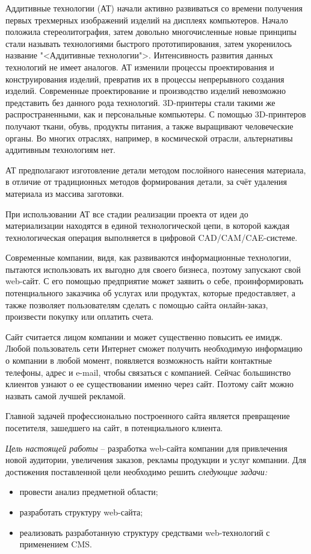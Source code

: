 \newsection
{}

Аддитивные технологии (АТ) начали активно развиваться со времени получения первых трехмерных изображений изделий на дисплеях компьютеров. Начало положила стереолитография, затем довольно многочисленные новые принципы стали называть технологиями быстрого прототипирования, затем укоренилось название "<Аддитивные технологии">. Интенсивность развития данных технологий не имеет аналогов. АТ изменили процессы проектирования и конструирования изделий, превратив их в процессы непрерывного создания изделий. Современные проектирование и производство изделий невозможно представить без данного рода технологий. 3D-принтеры стали такими же распространенными, как и персональные компьютеры. С помощью 3D-принтеров получают ткани, обувь, продукты питания, а также выращивают человеческие органы. Во многих отраслях, например, в космической отрасли, альтернативы аддитивным технологиям нет.

АТ предполагают изготовление детали методом послойного нанесения материала, в отличие от традиционных методов формирования детали, за счёт удаления материала из массива заготовки.

При использовании АТ все стадии реализации проекта от идеи до материализации находятся в единой технологической цепи, в которой каждая технологическая операция выполняется в цифровой CAD/CAM/CAE-системе.

Современные компании, видя, как развиваются информационные технологии, пытаются использовать их выгодно для своего бизнеса, поэтому запускают свой web-сайт. С его помощью предприятие может заявить о себе, проинформировать потенциального заказчика об услугах или продуктах, которые предоставляет, а также позволяет пользователям сделать с помощью сайта онлайн-заказ, произвести покупку или оплатить счета.

Сайт считается лицом компании и может существенно повысить ее имидж. Любой пользователь сети Интернет сможет получить необходимую информацию о компании в любой момент, появляется возможность найти контактные телефоны, адрес и e-mail, чтобы связаться с компанией. Сейчас большинство клиентов узнают о ее существовании именно через сайт. Поэтому сайт можно назвать самой лучшей рекламой. 

Главной задачей профессионально построенного сайта является превращение посетителя, зашедшего на сайт, в потенциального клиента.

\emph{Цель настоящей работы} – разработка web-сайта компании для привлечения новой аудитории, увеличения заказов, рекламы продукции и услуг компании. Для достижения поставленной цели необходимо решить \emph{следующие задачи:}
\begin{itemize}
\item провести анализ предметной области;
\item разработать структуру web-сайта;
\item реализовать разработанную структуру средствами web-технологий с применением CMS.
\end{itemize}


